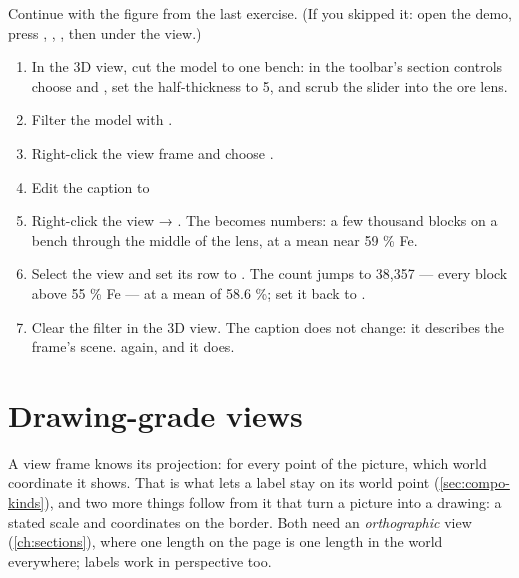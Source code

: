 \begin{tryit}
Continue with the figure from the last exercise. (If you skipped it: open the demo, press , , , then  under the view.)
\begin{enumerate}
\item In the 3D view, cut the model to one bench: in the toolbar's section controls choose  and , set the half-thickness to 5, and scrub the slider into the ore lens.
\item Filter the model with .
\item Right-click the view frame and choose .
\item Edit the caption to\\
\item Right-click the view → . The  becomes numbers: a few thousand blocks on a bench through the middle of the lens, at a mean near 59 \% Fe.
\item Select the view and set its  row to . The count jumps to 38,357 — every block above 55 \% Fe — at a mean of 58.6 \%; set it back to .
\item Clear the filter in the 3D view. The caption does not change: it describes the frame's scene.  again, and it does.
\end{enumerate}
\end{tryit}


\section{Drawing-grade views}\label{sec:compo-drawing}

A view frame knows its projection: for every point of the picture, which world coordinate it shows. That is what lets a label stay on its world point (\cref{sec:compo-kinds}), and two more things follow from it that turn a picture into a drawing: a stated scale and coordinates on the border. Both need an \emph{orthographic} view (\cref{ch:sections}), where one length on the page is one length in the world everywhere; labels work in perspective too.


